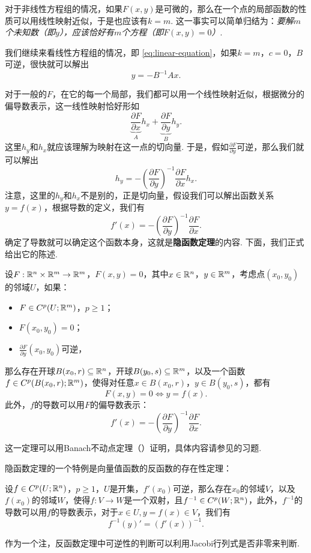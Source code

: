 对于非线性方程组的情况，如果$F(x,y)$是可微的，那么在一个点的局部函数的性质可以用线性映射近似，于是也应该有$k=m$. 这一事实可以简单归结为：\emph{要解$m$个未知数（即$y$），应该恰好有$m$个方程（即$F(x,y)=0$）}.

我们继续来看线性方程组的情况，即 \eqref{eq:linear-equation}，如果$k=m$，$c=0$，$B$可逆，很快就可以解出
\[y=-B^{-1}Ax.\]

对于一般的$F$，在它的每一个局部，我们都可以用一个线性映射近似，根据微分的偏导数表示，这一线性映射恰好形如
\[\underbrace{\frac{\partial F}{\partial x}}_A h_x+\underbrace{\frac{\partial F}{\partial y}}_B h_y.\]
这里$h_y$和$h_x$就应该理解为映射在这一点的切向量. 
于是，假如$\frac{\partial F}{\partial y}$可逆，那么我们就可以解出
\[h_y=-\left(\frac{\partial F}{\partial y}\right)^{-1}\frac{\partial F}{\partial x}h_x.\]
注意，这里的$h_y$和$h_x$不是别的，正是切向量，假设我们可以解出函数关系$y=f(x)$，根据导数的定义，我们有
\[f'(x)=-\left(\frac{\partial F}{\partial y}\right)^{-1}\frac{\partial F}{\partial x}.\]
确定了导数就可以确定这个函数本身，这就是\textbf{隐函数定理}的内容. 下面，我们正式给出它的陈述. 

\begin{theorem}[隐函数定理]\label{thm:implicit-function}
    设$F:\mathbb{R}^n\times\mathbb{R}^m\to\mathbb{R}^m$，$F(x,y)=0$，其中$x\in\mathbb{R}^n$，$y\in\mathbb{R}^m$，考虑点$(x_0,y_0)$的邻域$U$，如果：
    \begin{itemize}
        \item $F\in C^p(U;\mathbb{R}^m)$，$p\geq 1$；
        \item $F(x_0,y_0)=0$；
        \item $\frac{\partial F}{\partial y}(x_0,y_0)$可逆，
    \end{itemize}
    那么存在开球$B(x_0,r)\subseteq\mathbb{R}^n$，开球$B(y_0,s)\subseteq\mathbb{R}^m$，以及一个函数$f\in C^p(B(x_0,r);\mathbb{R}^m)$，使得对任意$x\in B(x_0,r)$，$y\in B(y_0,s)$，都有
    \[F(x,y)=0\iff y=f(x).\]
    此外，$f$的导数可以用$F$的偏导数表示：
    \[f'(x)=-\left(\frac{\partial F}{\partial y}\right)^{-1}\frac{\partial F}{\partial x}.\]
\end{theorem}
这一定理可以用Banach不动点定理（）证明，具体内容请参见的习题. 

隐函数定理的一个特例是向量值函数的反函数的存在性定理：

\begin{theorem}[反函数定理]\label{thm:inverse-function}
    设$f\in C^p(U;\mathbb{R}^n)$，$p\geq 1$，$U$是开集，$f'(x_0)$可逆，那么存在$x_0$的邻域$V$，以及$f(x_0)$的邻域$W$，使得$f:V\to W$是一个双射，且$f^{-1}\in C^p(W;\mathbb{R}^n)$，此外，$f^{-1}$的导数可以用$f$的导数表示，对于$x\in U,y=f(x)\in V$，我们有
    \[f^{-1}(y)'=(f'(x))^{-1}.\]
\end{theorem}
作为一个注，反函数定理中可逆性的判断可以利用Jacobi行列式是否非零来判断. 


